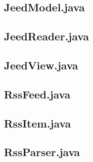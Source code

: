 \documentclass[titlepage, twoside, a4paper, 12pt]{article}
\begin{document}
\newpage
\subsection{JeedModel.java}\label{JeedModel.java}
\begin{footnotesize}
  
\end{footnotesize}

\newpage
\subsection{JeedReader.java}\label{JeedReader.java}
\begin{footnotesize}
  
\end{footnotesize}

\newpage
\subsection{JeedView.java}\label{JeedView.java}
\begin{footnotesize}
  
\end{footnotesize}

\newpage
\subsection{RssFeed.java}\label{RssFeed.java}
\begin{footnotesize}
  
\end{footnotesize}

\newpage
\subsection{RssItem.java}\label{RssItem.java}
\begin{footnotesize}
  
\end{footnotesize}

\newpage
\subsection{RssParser.java}\label{RssParser.java}
\begin{footnotesize}
  
\end{footnotesize}
  
\end{document}
